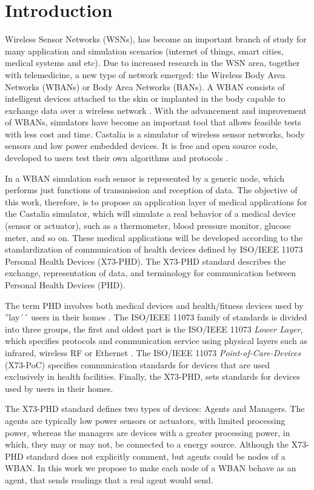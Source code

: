 \section{Introduction}

Wireless Sensor Networks (WSNs), has become an important branch of study for many application and simulation scenarios (internet of things, smart cities, medical systems and etc). Due to increased research in the WSN area, together with telemedicine, a new type of network emerged: the Wireless Body Area Networks (WBANs) or Body Area Networks (BANs). A WBAN consists of intelligent devices attached to the skin or implanted in the body capable to exchange data over a wireless network \cite{b18}. With the advancement and improvement of WBANs, simulators have become an important tool that allows feasible tests with less cost and time. Castalia is a simulator of wireless sensor networks, body sensors and low power embedded devices. It is free and open source code, developed to users test their own algorithms and protocols \cite{b15}. 

In a WBAN simulation each sensor is represented by a generic node, which performs just functions of transmission and reception of data. The objective of this work, therefore, is to propose an application layer of medical applications for the Castalia simulator, which will simulate a real behavior of a medical device (sensor or actuator), such as a thermometer, blood pressure monitor, glucose meter, and so on. These medical applications will be developed according to the standardization of communication of health devices defined by ISO/IEEE 11073 Personal Health Devices (X73-PHD). The X73-PHD standard describes the exchange, representation of data, and terminology for communication between Personal Health Devices (PHD).

The term PHD involves both medical devices and health/fitness devices used by ''lay´´ users in their homes \cite{b3}. The ISO/IEEE 11073 family of standards is divided into three groups, the first and oldest part is the ISO/IEEE 11073 \textit{Lower Layer}, which specifies protocols and communication service using physical layers such as infrared, wireless RF or Ethernet \cite{b16}. The ISO/IEEE 11073 \textit{Point-of-Care-Devices} (X73-PoC) specifies communication standards for devices that are used exclusively in health facilities. Finally, the X73-PHD, sets standards for devices used by users in their homes.

The X73-PHD standard defines two types of devices: Agents and Managers. The agents are typically low power sensors or actuators, with limited processing power, whereas the managers are devices with a greater processing power, in which, they may or may not, be connected to a energy source. Although the X73-PHD standard does not explicitly comment, but agents could be nodes of a WBAN. In this work we propose to make each node of a WBAN behave as an agent, that sends readings that a real agent would send.

